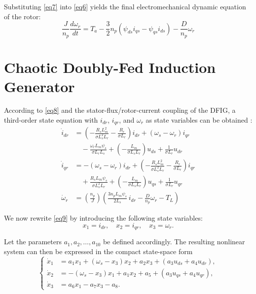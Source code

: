 \documentclass[conference]{IEEEtran}
\begin{document}
Substituting \eqref{eq7} into \eqref{eq6} yields the final electromechanical dynamic equation of the rotor:
\begin{equation}
\frac{J}{n_{p}}\frac{d\omega_{r}}{dt} = T_{a} - \frac{3}{2}n_{p}\left( \psi_{ds}i_{qs} - \psi_{qs}i_{ds} \right) - \frac{D}{n_{p}}\omega_{r}
\label{eq8}
\end{equation}

\section{Chaotic Doubly-Fed Induction Generator}

According to \eqref{eq8} and the stator-flux/rotor-current coupling of the DFIG, a third-order state equation with $i_{dr}$, $i_{qr}$, and $\omega_{r}$ as state variables can be obtained \cite{b24}:
\begin{equation}
\begin{aligned}
\dot{i}_{dr} &= \left( - \frac{R_{s}L_{m}^{2}}{\sigma L_{s}^{2}L_{r}} - \frac{R_{r}}{\sigma L_{r}} \right)i_{dr} + \left( \omega_{s} - \omega_{r} \right)i_{qr} \\
&\quad- \frac{\omega_{r}L_{m}\psi_{s}}{\sigma L_{r}L_{s}} + \left( - \frac{L_{m}}{\sigma L_{s}L_{r}} \right)u_{ds} + \frac{1}{\sigma L_{r}}u_{dr} \\[4pt]
\dot{i}_{qr} &= - \left( \omega_{s} - \omega_{r} \right)i_{dr} + \left( - \frac{R_{s}L_{m}^{2}}{\sigma L_{s}^{2}L_{r}} - \frac{R_{r}}{\sigma L_{r}} \right)i_{qr} \\
&\quad+ \frac{R_{s}L_{m}\psi_{s}}{\sigma L_{s}^{2}L_{r}} + \left( - \frac{L_{m}}{\sigma L_{s}L_{r}} \right)u_{qs} + \frac{1}{\sigma L_{r}}u_{qr} \\[4pt]
\dot{\omega}_{r} &= \left( \frac{n_{p}}{J} \right)\left( \frac{3n_{p}L_{m}\psi_{s}}{2L_{s}}\, i_{dr} - \frac{D}{n_{p}}\omega_{r} - T_{L} \right)
\end{aligned}
\label{eq9}
\end{equation}

We now rewrite \eqref{eq9} by introducing the following state variables:
\begin{equation*}
x_{1} = i_{dr},\quad x_{2} = i_{qr},\quad x_{3} = \omega_{r}.
\end{equation*}

Let the parameters $a_{1},a_{2},\ldots,a_{10}$ be defined accordingly. The resulting nonlinear system can then be expressed in the compact state-space form
\begin{equation}
\left\{ \begin{aligned}
\dot{x}_{1} &= a_{1}x_{1} + \left( \omega_{s} - x_{3} \right)x_{2} + a_{2}x_{3} + \left( a_{3}u_{ds} + a_{4}u_{dr} \right), \\
\dot{x}_{2} &= - \left( \omega_{s} - x_{3} \right)x_{1} + a_{1}x_{2} + a_{5} + \left( a_{3}u_{qs} + a_{4}u_{qr} \right), \\
\dot{x}_{3} &= a_{6}x_{1} - a_{7}x_{3} - a_{8}.
\end{aligned} \right.
\label{eq10}
\end{equation}
\end{document}
